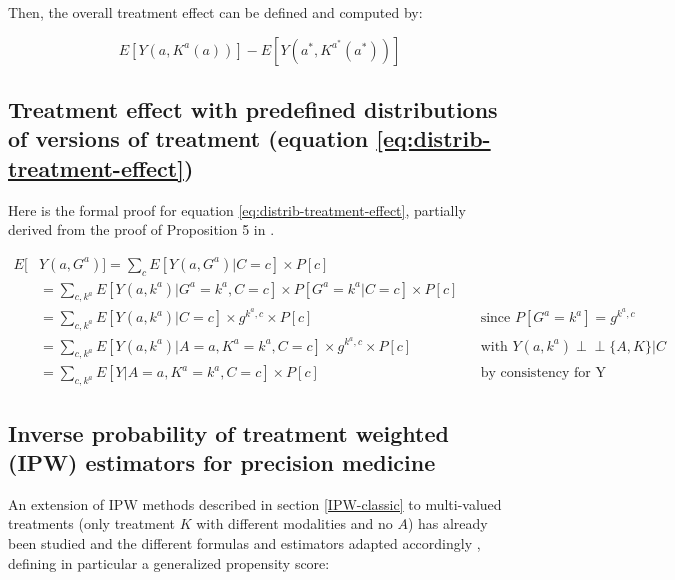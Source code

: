 \documentclass[a4paper,12pt,twoside,onecolumn,openright,final,oldfontcommands]{memoir}
\begin{document}
\endgroup

Then, the overall treatment effect can be defined and computed by:

\[E[Y(a, K^a(a))] - E[Y(a^*, K^{a^*}(a^*))]\]

\subsection{Treatment effect with predefined distributions of versions
of treatment (equation
\eqref{eq:distrib-treatment-effect})}\label{appendix-distrib-treatment-effect}

Here is the formal proof for equation \eqref{eq:distrib-treatment-effect},
partially derived from the proof of Proposition 5 in
\citep{vanderweele2013causal}.

\begingroup
\footnotesize

\begin{equation*}
\begin{aligned}
  E[ & Y(a, G^a)] = \sum_{c} E[Y(a, G^a)|C=c] \times P[c]\\
             & = \sum_{c, k^a} E[Y(a, k^a)|G^a=k^a, C=c] \times P[G^a=k^a|C=c] \times P[c]\\
             & = \sum_{c, k^a} E[Y(a, k^a)| C=c] \times g^{k^a,c} \times P[c]
             &&\text{since } P[G^a=k^a] = g^{k^a,c}\\
             & = \sum_{c, k^a} E[Y(a, k^a)| A=a, K^a=k^a, C=c] \times g^{k^a,c} \times P[c] 
             &&\text{with } Y(a,k^a) \perp \!\!\! \perp \{A,K\} | C\\
             & = \sum_{c, k^a} E[Y| A=a, K^a=k^a, C=c] \times P[c]
             &&\text{by consistency for Y}
\end{aligned}
\end{equation*}

\endgroup

\subsection{Inverse probability of treatment weighted (IPW) estimators
for precision medicine}\label{appendix-IPW}

An extension of IPW methods described in section \ref{IPW-classic} to
multi-valued treatments (only treatment \(K\) with different modalities
and no \(A\)) has already been studied and the different formulas and
estimators adapted accordingly
\citep{imbens2000role, feng2012generalized}, defining in particular a
generalized propensity score:
\end{document}
